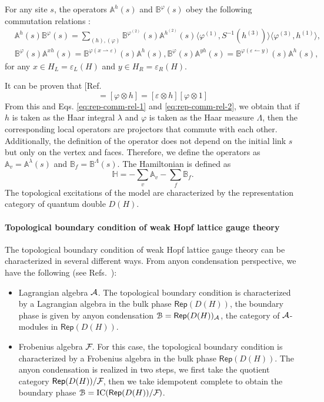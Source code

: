 \documentclass[a4paper,11pt]{article}
\theoremstyle{theorem}
\theoremstyle{remark}
\newcommand\eB           {\EuScript{B}}
\newcommand{\Av}{\mathbb{A}}
\newcommand{\Bf}{\mathbb{B}}
\newcommand{\Rep}{\mathsf{Rep}}
\newcommand{\cA}{\text{\usefont{OMS}{cmsy}{m}{n}A}}
\newcommand{\cF}{\text{\usefont{OMS}{cmsy}{m}{n}F}}
\begin{document}
For any site \(s\), the operators \(\Av^h(s)\) and \(\Bf^\varphi(s)\) obey the following commutation relations \cite{Jia2023weak}:
\begin{align}
    &\Av^h(s)\Bf^\varphi(s) = \sum_{(h),(\varphi)} \Bf^{\varphi^{(2)}}(s) \Av^{h^{(2)}}(s) \langle \varphi^{(1)}, S^{-1}(h^{(3)}) \rangle \langle \varphi^{(3)}, h^{(1)} \rangle, \label{eq:rep-comm-rel-1} \\
    &\Bf^\varphi(s) \Av^{xh}(s) = \Bf^{\varphi(x\rightharpoonup \varepsilon)}(s) \Av^h(s), 
    \Bf^\varphi(s) \Av^{yh}(s) = \Bf^{\varphi(\varepsilon \leftharpoonup y)}(s) \Av^h(s), \label{eq:rep-comm-rel-2}
\end{align}
for any \(x \in H_L=\varepsilon_L(H)\) and \(y \in H_R=\varepsilon_R(H)\). 


It can be proven that [Ref. \cite[Lemma 2]{chang2014kitaev}
\begin{equation}
    [\varphi\otimes 1][\varepsilon \otimes h] =[\varphi \otimes h] =[\varepsilon \otimes h]  [\varphi \otimes 1]
\end{equation}
From this and Eqs. \eqref{eq:rep-comm-rel-1} and \eqref{eq:rep-comm-rel-2}, we obtain that if $h$ is taken as the Haar integral $\lambda$ and $\varphi$ is taken as the Haar measure $\Lambda$, then the corresponding local operators are projectors that commute with each other. Additionally, the definition of the operator does not depend on the initial link $s$ but only on the vertex and faces. Therefore, we define the operators as $\Av_v = \Av^{\lambda}(s)$ and $\Bf_f = \Bf^{\Lambda}(s)$. The Hamiltonian is defined as
\begin{equation}
    \mathbb{H}=-\sum_v \Av_v -\sum_f \Bf_f.
\end{equation}
The topological excitations of the model are characterized by the representation category of quantum double $D(H)$.


\paragraph{Topological boundary condition of weak Hopf lattice gauge theory}

The topological boundary condition of weak Hopf lattice gauge theory can be characterized in several different ways.
From anyon condensation perspective, we have the following (see Refs.~\cite{Kong2014,Cong2017,jia2022electricmagnetic,burnell2018anyon,eliens2010anyon,jia2023boundary,Jia2023weak}):
\begin{itemize}
    \item Lagrangian algebra $\cA$. The topological boundary condition is characterized by a Lagrangian algebra in the bulk phase $\Rep(D(H))$, the boundary phase is given by anyon condensation $\eB=\Rep(D(H))_{\cA}$, the category of $\cA$-modules in $\Rep(D(H))$.
    \item Frobenius algebra $\cF$. For this case, the topological boundary condition is characterized by a  Frobenius algebra  in the bulk phase $\Rep(D(H))$. The anyon condensation is realized in two steps, we first take the quotient category $\Rep(D(H))/\cF$, then we take idempotent complete  to obtain the boundary phase $\eB=\operatorname{IC}(\Rep(D(H))/\cF)$.
\end{itemize}
\end{document}

